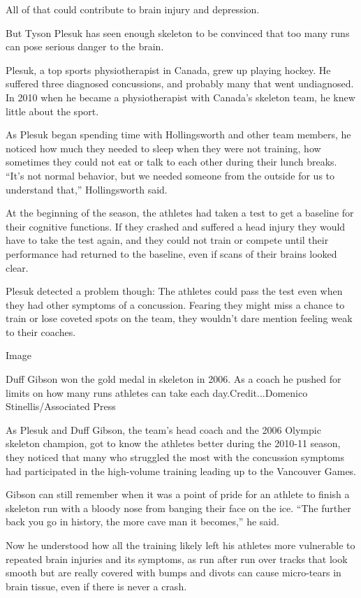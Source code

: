 All of that could contribute to brain injury and depression.

But Tyson Plesuk has seen enough skeleton to be convinced that too many
runs can pose serious danger to the brain.

Plesuk, a top sports physiotherapist in Canada, grew up playing hockey.
He suffered three diagnosed concussions, and probably many that went
undiagnosed. In 2010 when he became a physiotherapist with Canada's
skeleton team, he knew little about the sport.

As Plesuk began spending time with Hollingsworth and other team members,
he noticed how much they needed to sleep when they were not training,
how sometimes they could not eat or talk to each other during their
lunch breaks. ``It's not normal behavior, but we needed someone from the
outside for us to understand that,'' Hollingsworth said.

At the beginning of the season, the athletes had taken a test to get a
baseline for their cognitive functions. If they crashed and suffered a
head injury they would have to take the test again, and they could not
train or compete until their performance had returned to the baseline,
even if scans of their brains looked clear.

Plesuk detected a problem though: The athletes could pass the test even
when they had other symptoms of a concussion. Fearing they might miss a
chance to train or lose coveted spots on the team, they wouldn't dare
mention feeling weak to their coaches.

Image

Duff Gibson won the gold medal in skeleton in 2006. As a coach he pushed
for limits on how many runs athletes can take each day.Credit...Domenico
Stinellis/Associated Press

As Plesuk and Duff Gibson, the team's head coach and the 2006 Olympic
skeleton champion, got to know the athletes better during the 2010-11
season, they noticed that many who struggled the most with the
concussion symptoms had participated in the high-volume training leading
up to the Vancouver Games.

Gibson can still remember when it was a point of pride for an athlete to
finish a skeleton run with a bloody nose from banging their face on the
ice. ``The further back you go in history, the more cave man it
becomes,'' he said.

Now he understood how all the training likely left his athletes more
vulnerable to repeated brain injuries and its symptoms, as run after run
over tracks that look smooth but are really covered with bumps and
divots can cause micro-tears in brain tissue, even if there is never a
crash.

